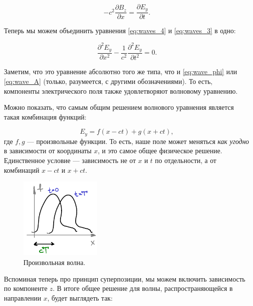 \documentclass[11pt,a4paper]{article}
\numberwithin{equation}{section}
\newcommand{\pt}{\partial}
\begin{document}
\begin{equation}
  \label{eq:waves_4}
  -c^2 \frac{\pt B_z}{\pt x} = \frac{\pt E_y}{\pt t}.
\end{equation}

Теперь мы можем объединить уравнения \eqref{eq:waves_4} и
\eqref{eq:waves_3} в одно: 

\begin{equation}
  \label{eq:waves_E}
  \frac{\pt^2 E_y}{\pt x^2} - \frac{1}{c^2} \frac{\pt^2 E_y}{\pt t^2}=0.
\end{equation}

Заметим, что это уравнение абсолютно того же типа, что и
\eqref{eq:wave_phi} или \eqref{eq:wave_A} (только, разумеется, с
другими обозначениями). То есть, компоненты электрического поля также
удовлетворяют волновому уравнению. 

Можно показать, что самым общим решением волнового уравнения является
такая комбинация функций: 

\begin{equation}
  \label{eq:waves_general_solution_1}
  E_y = f(x-ct) + g(x+ct),
\end{equation}
где $f,g$ --- произвольные функции. То есть, наше поле может меняться
\textit{как угодно} в зависимости от координаты $x$, и это самое общее
физическое решение. Единственное условие --- зависимость не от $x$ и
$t$ по отдельности, а от комбинаций $x-ct$ и $x+ct$. 

\begin{figure}
  \vspace{-1cm}
  \begin{center}
  \includegraphics[width=4cm]{wave.pdf}  
  \end{center}
  \vspace{-0.5cm}
  \caption{Произвольная волна.}
  \label{fig:wave}
\end{figure}

Вспоминая теперь про принцип суперпозиции, мы можем включить
зависимость по компоненте $z$. В итоге общее решение для волны,
распространяющейся в направлении $x$, будет выглядеть так: 
\end{document}
